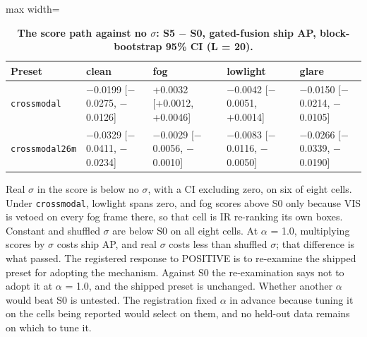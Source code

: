 \documentclass[10pt]{article}
\begin{document}
\begin{table}[htbp]
\centering
\footnotesize
\caption{\textbf{The score path against no $\sigma$: S5 $-$ S0, gated-fusion ship AP, block-bootstrap 95\% CI (L = 20).}}
\label{tab:11}
\begin{adjustbox}{max width=\linewidth}
\begin{tabular}{lllll}
\toprule
Preset & clean & fog & lowlight & glare \\
\midrule
\texttt{crossmodal} & $-$0.0199 [$-$0.0275, $-$0.0126] & +0.0032 [+0.0012, +0.0046] & $-$0.0042 [$-$0.0051, +0.0014] & $-$0.0150 [$-$0.0214, $-$0.0105] \\
\texttt{crossmodal26m} & $-$0.0329 [$-$0.0411, $-$0.0234] & $-$0.0029 [$-$0.0056, $-$0.0010] & $-$0.0083 [$-$0.0116, $-$0.0050] & $-$0.0266 [$-$0.0339, $-$0.0190] \\
\bottomrule
\end{tabular}
\end{adjustbox}
\end{table}
Real $\sigma$ in the score is below no $\sigma$, with a CI excluding zero, on six of eight cells. Under \texttt{crossmodal}, lowlight spans zero, and fog scores above S0 only because VIS is vetoed on every fog frame there, so that cell is IR re-ranking its own boxes. Constant and shuffled $\sigma$ are below S0 on all eight cells. At $\alpha$ = 1.0, multiplying scores by $\sigma$ costs ship AP, and real $\sigma$ costs less than shuffled $\sigma$; that difference is what passed. The registered response to POSITIVE is to re-examine the shipped preset for adopting the mechanism. Against S0 the re-examination says not to adopt it at $\alpha$ = 1.0, and the shipped preset is unchanged. Whether another $\alpha$ would beat S0 is untested. The registration fixed $\alpha$ in advance because tuning it on the cells being reported would select on them, and no held-out data remains on which to tune it.
\end{document}
